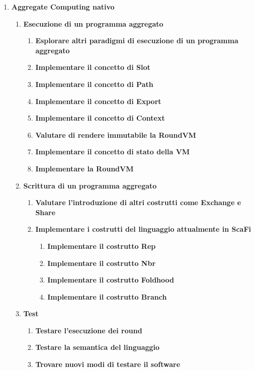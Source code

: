 \documentclass[12pt, a4paper]{article}
\begin{document}
\begin{enumerate}
    \item \textbf{Aggregate Computing nativo}
        \begin{enumerate}
            \item \textbf{Esecuzione di un programma aggregato}
            \begin{enumerate}
                \item \textbf{Esplorare altri paradigmi di esecuzione di un programma aggregato}
                \item \textbf{Implementare il concetto di Slot}
                \item \textbf{Implementare il concetto di Path}
                \item \textbf{Implementare il concetto di Export}
                \item \textbf{Implementare il concetto di Context}
                \item \textbf{Valutare di rendere immutabile la RoundVM}
                \item \textbf{Implementare il concetto di stato della VM}
                \item \textbf{Implementare la RoundVM}
            \end{enumerate}

            \item \textbf{Scrittura di un programma aggregato}
            \begin{enumerate}
                \item \textbf{Valutare l'introduzione di altri costrutti come Exchange e Share}
                \item \textbf{Implementare i costrutti del linguaggio attualmente in ScaFi}
                \begin{enumerate}
                    \item \textbf{Implementare il costrutto Rep}
                    \item \textbf{Implementare il costrutto Nbr}
                    \item \textbf{Implementare il costrutto Foldhood}
                    \item \textbf{Implementare il costrutto Branch}
                \end{enumerate}
            \end{enumerate}
            

            \item \textbf{Test}
            \begin{enumerate}
                \item \textbf{Testare l'esecuzione dei round}
                \item \textbf{Testare la semantica del linguaggio}
                \item \textbf{Trovare nuovi modi di testare il software}
            \end{enumerate}
        \end{enumerate}


\end{enumerate}
\end{document}
